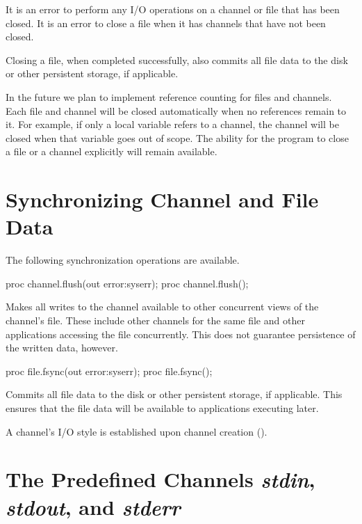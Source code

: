 It is an error to perform any I/O operations on a channel or file
that has been closed.
It is an error to close a file when it has channels that
have not been closed.

Closing a file, when completed successfully, also commits
all file data to the disk or other persistent storage,
if applicable.

\begin{future}
In the future we plan to implement reference counting for files
and channels. Each file and channel will be closed automatically
when no references remain to it. For example, if only a local
variable refers to a channel, the channel will be closed
when that variable goes out of scope.
The ability for the program to close a file or a channel
explicitly will remain available.
\end{future}


\section{Synchronizing Channel and File Data}
\label{IO_synchronization}

The following synchronization operations are available.

\begin{protohead}
proc channel.flush(out error:syserr);
proc channel.flush();
\end{protohead}
\begin{protobody}
Makes all writes to the channel available to other concurrent views of the
channel's file. These include other channels for the same file and
other applications accessing the file concurrently.
This does not guarantee persistence of the written data, however.
\end{protobody}

\begin{protohead}
proc file.fsync(out error:syserr);
proc file.fsync();
\end{protohead}
\begin{protobody}
Commits all file data to the disk or other persistent storage, if
applicable. This ensures that the file data will be available to
applications executing later.
\end{protobody}

A channel's I/O style is established upon channel creation
().


\section{The Predefined Channels {\em stdin}, {\em stdout}, and {\em stderr}}
\label{IO_std_channels}

